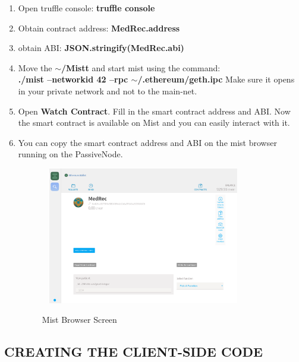 \documentclass[journal,12pt,twocolumn]{IEEEtran}
\begin{document}
\begin{enumerate}
\item Open truffle console: \textbf{truffle console}

\item Obtain contract address: \textbf{MedRec.address}

\item obtain ABI: \textbf{ JSON.stringify(MedRec.abi)}


\item Move the \textbf{$\sim$/Mistt} and start mist using the command:\\
\textbf{./mist --networkid 42 --rpc $\sim$/.ethereum/geth.ipc}
Make sure it opens in your private network and not to the main-net.
\item Open \textbf{Watch Contract}. Fill in the smart contract address and ABI.
Now the smart contract is available on Mist and you can easily interact with it. 
\item You can copy the smart contract address and ABI on the mist browser running on the PassiveNode.

\begin{figure} 
  \includegraphics[width=9cm, height=6cm]{mist.png}
  \label{fig:7}
  \caption{Mist Browser Screen}
\end{figure} 
\end{enumerate}

\subsection{CREATING THE CLIENT-SIDE CODE}
\end{document}

